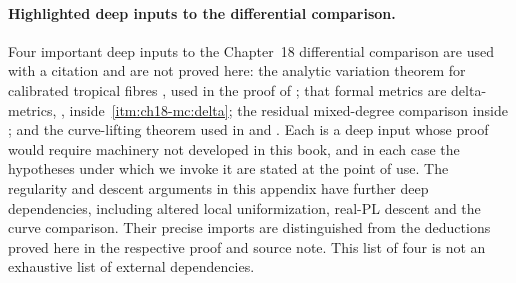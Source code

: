 \paragraph{Highlighted deep inputs to the differential comparison.}
\label{sec:appM-highlighted-imports}
Four important deep inputs to the Chapter~18 differential comparison are
used with a citation and are not proved here: the analytic variation theorem
for calibrated tropical fibres
\cite[Theorem~14.7.2]{CLD25}, used in the proof of
; that
formal metrics are delta-metrics, \cite[Proposition~8.11]{GK17}, inside
\,\cref{itm:ch18-mc:delta}; the residual
mixed-degree comparison \cite[Theorem~10.5]{GK17} inside
; and the curve-lifting theorem used in
 and
.  Each is a deep input whose proof would require
machinery not developed in this book, and in each case the hypotheses under
which we invoke it are stated at the point of use. The regularity and
descent arguments in this appendix have further deep dependencies, including
altered local uniformization, real-PL descent and the curve comparison.
Their precise imports are distinguished from the deductions proved here in
the respective proof and source note. This list of four is not an exhaustive
list of external dependencies.
